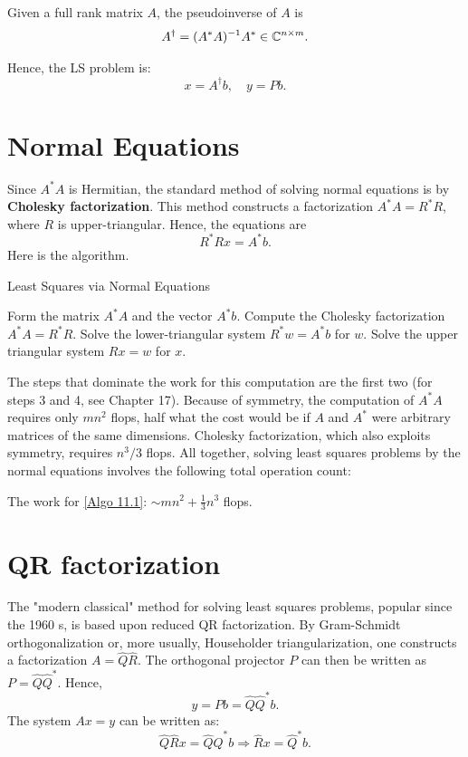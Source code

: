 \begin{definition}
[Pseudoinverse]
\label{def: Pseudoinverse}
Given a full rank matrix $A$, the pseudoinverse of $A$ is 
\[
    A^\dagger =  (A^*A)^{-1}A^* \in \mathbb{C}^{n\times m}. 
\]
\end{definition}
Hence, the LS problem is: 
\[
    x = A^\dagger b, \quad y = Pb. 
\]

\section{Normal Equations} 
Since $A^*A$ is Hermitian, the standard method of solving normal equations is by \textbf{Cholesky factorization}. This method constructs a factorization  $A^*A = R^*R$, where $R$ is upper-triangular. Hence, the equations are 
\[
    R^*R x = A^*b. 
\]
Here is the algorithm. 

\begin{algorithm}[H]
    \caption{Least Squares via Normal Equations}
    \label{Algo 11.1}
    Form the matrix $A^*A$ and the vector $A^*b$.\; 
    Compute the Cholesky factorization $A^*A = R^*R$.\; 
    Solve the lower-triangular system $R^*w = A^*b$ for $w$. \; 
    Solve the upper triangular system $Rx = w$ for $x$. 
\end{algorithm}

The steps that dominate the work for this computation are the first two (for steps 3 and 4, see Chapter 17). Because of symmetry, the computation of $A^* A$ requires only $m n^2$ flops, half what the cost would be if $A$ and $A^*$ were arbitrary matrices of the same dimensions. Cholesky factorization, which also exploits symmetry, requires $n^3 / 3$ flops. All together, solving least squares problems by the normal equations involves the following total operation count:


\begin{corollary}
\label{cor: cost of 11.1}
The work for \autoref{Algo 11.1}: $\sim m n^2+\frac{1}{3} n^3$ flops. 
\end{corollary}

\section{QR factorization} 
The "modern classical" method for solving least squares problems, popular since the 1960 s, is based upon reduced QR factorization. By Gram-Schmidt orthogonalization or, more usually, Householder triangularization, one constructs a factorization $A=\hat{Q} \hat{R}$. The orthogonal projector $P$ can then be written as $P= \hat Q \hat Q^*$.  Hence, 
\[
    y = Pb = \hat Q \hat Q^* b. 
\]
The system $Ax=y$ can be written as: 
\[
    \hat Q \hat R x = \hat Q \hat Q^* b\Rightarrow \hat R x = \hat Q^* b. 
\]

